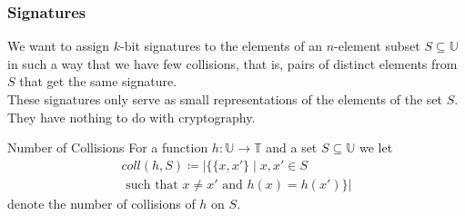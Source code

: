 \documentclass[english]{panikzettel}
\begin{document}
%


\subsubsection{Signatures}
\begin{halfboxl}
\vspace{-\baselineskip}
	We want to assign $k$-bit signatures to the elements of an $n$-element subset $S\subseteq \mathbb{U}$ in such a way that we have few collisions, that is, pairs of distinct elements from $S$ that get the same signature.\\
	These signatures only serve as small representations of the elements of the set $S$. They have nothing to do with cryptography.
\end{halfboxl}
\begin{halfboxr}
\vspace{-\baselineskip}
	\begin{defi}{Number of Collisions}
	For a function $h:\mathbb{U}\to\mathbb{T}$ and a set $S\subseteq \mathbb{U}$ we let
	\begin{multline*}
	coll(h,S)\coloneqq |\{\{x,x'\}\mid x,x'\in S \\
	\text{ such that } x\neq x' \text{ and } h(x)=h(x') \}|
	\end{multline*}
	denote the number of collisions of $h$ on $S$.
	\end{defi}
\end{halfboxr}
\end{document}

